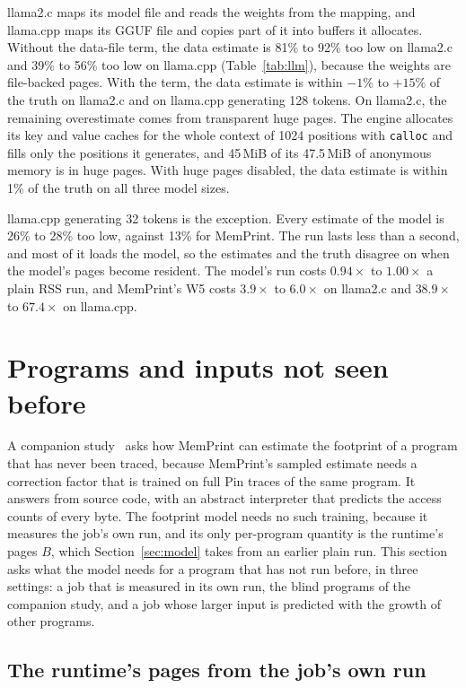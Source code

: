 \documentclass[11pt]{article}
\newcommand{\memprint}{MemPrint}
\newcommand{\secref}[1]{Section~\ref{#1}}
\newcommand{\tabref}[1]{Table~\ref{#1}}
\begin{document}
llama2.c maps its model file and reads the weights from the mapping, and llama.cpp maps its GGUF file and copies part
of it into buffers it allocates. Without the data-file term, the data estimate is 81\% to 92\% too low on llama2.c and
39\% to 56\% too low on llama.cpp (\tabref{tab:llm}), because the weights are file-backed pages. With the term, the
data estimate is within $-1\%$ to $+15\%$ of the truth on llama2.c and on llama.cpp generating 128 tokens. On
llama2.c, the remaining overestimate comes from transparent huge pages. The engine allocates its key and value caches
for the whole context of 1024 positions with \texttt{calloc} and fills only the positions it generates, and 45\,MiB of
its 47.5\,MiB of anonymous memory is in huge pages. With huge pages disabled, the data estimate is within 1\% of the
truth on all three model sizes.

llama.cpp generating 32 tokens is the exception. Every estimate of the model is 26\% to 28\% too low, against 13\% for
\memprint{}. The run lasts less than a second, and most of it loads the model, so the estimates and the truth disagree
on when the model's pages become resident. The model's run costs $0.94\times$ to $1.00\times$ a plain RSS run, and
\memprint{}'s W5 costs $3.9\times$ to $6.0\times$ on llama2.c and $38.9\times$ to $67.4\times$ on llama.cpp.

\section{Programs and inputs not seen before}
\label{sec:general}

A companion study~\cite{memprintstatic} asks how \memprint{} can estimate the footprint of a program that has never
been traced, because \memprint{}'s sampled estimate needs a correction factor that is trained on full Pin traces of
the same program. It answers from source code, with an abstract interpreter that predicts the access counts of every
byte. The footprint model needs no such training, because it measures the job's own run, and its only per-program
quantity is the runtime's pages $B$, which \secref{sec:model} takes from an earlier plain run. This section asks
what the model needs for a program that has not run before, in three settings: a job that is measured in its own
run, the blind programs of the companion study, and a job whose larger input is predicted with the growth of other
programs.

\subsection{The runtime's pages from the job's own run}
\end{document}

